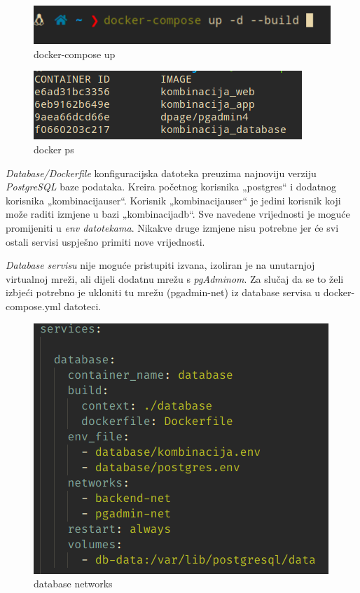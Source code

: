 		\begin{figure}[H]
					\includegraphics[scale=0.5]{figures/terminl_1.PNG}
					\centering
					\caption{docker-compose up}
					\label{fig:sekv-uc13}
				\end{figure}
				
		\begin{figure}[H]
					\includegraphics[scale=1]{figures/2-ps.PNG}
					\centering
					\caption{docker ps}
					\label{fig:sekv-uc13}
				\end{figure}
						
				
				
				
				
		 \textit{Database/Dockerfile} konfiguracijska datoteka preuzima najnoviju verziju  \textit{PostgreSQL} baze podataka. Kreira početnog korisnika „postgres“ i dodatnog korisnika „kombinacijauser“. Korisnik „kombinacijauser“ je jedini korisnik koji može raditi izmjene u bazi „kombinacijadb“. Sve navedene vrijednosti je moguće promijeniti u  \textit{env datotekama}. Nikakve druge izmjene nisu potrebne jer će svi ostali servisi uspješno primiti nove vrijednosti.

		 \textit{Database servisu} nije moguće pristupiti izvana, izoliran je na unutarnjoj virtualnoj mreži, ali dijeli dodatnu mrežu s  \textit{pgAdminom}. Za slučaj da se to želi izbjeći potrebno je ukloniti tu mrežu (pgadmin-net) iz database servisa u docker-compose.yml datoteci.	
			
			
						
		\begin{figure}[H]
					\includegraphics[scale=0.9]{figures/initdb.PNG}
					\centering
					\caption{database networks}
					\label{fig:sekv-uc13}
				\end{figure}
						
